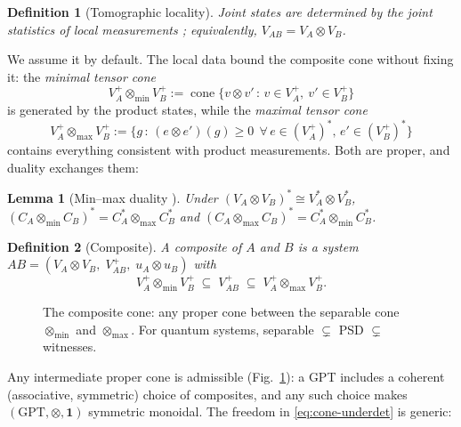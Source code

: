 \documentclass[prl,aps,10pt,superscriptaddress, floatfix]{revtex4-2}
\newtheorem{lemma}{Lemma}
\newtheorem*{defi}{Definition}
\begin{document}
\begin{defi}[Tomographic locality]
Joint states are determined by the joint statistics of local measurements \cite{Hardy2001,Barrett2007}; equivalently, $V_{AB}=V_A\otimes V_B$.
\end{defi}

We assume it by default. The local data bound the composite cone without fixing it: the \emph{minimal tensor cone}
\[
V_A^+\otimes_{\min}V_B^+:=\operatorname{cone}\{v\otimes v'\,:\,v\in V_A^+,\ v'\in V_B^+\}
\]
is generated by the product states, while the \emph{maximal tensor cone}
\[
V_A^+\otimes_{\max}V_B^+:=\{g\,:\,(e\otimes e')(g)\ge0\ \ \forall\,e\in(V_A^+)^*,\,e'\in(V_B^+)^*\}
\]
contains everything consistent with product measurements. Both are proper, and duality exchanges them:

\begin{lemma}[Min--max duality \cite{ALPP2021,Plavala2023}]\label{lem:minmax}
Under $(V_A\otimes V_B)^*\cong V_A^*\otimes V_B^*$,
$(C_A\otimes_{\min}C_B)^*=C_A^*\otimes_{\max}C_B^*$ and
$(C_A\otimes_{\max}C_B)^*=C_A^*\otimes_{\min}C_B^*$.
\end{lemma}

\begin{defi}[Composite]
A \emph{composite} of $A$ and $B$ is a system $AB=(V_A\otimes V_B,\;V_{AB}^+,\;u_A\otimes u_B)$ with
\begin{equation}\label{eq:cone-underdet}
V_A^+\otimes_{\min}V_B^+\;\subseteq\;V_{AB}^+\;\subseteq\;V_A^+\otimes_{\max}V_B^+ .
\end{equation}
\end{defi}

\begin{figure}[t]
\centering
{}
\caption{The composite cone: any proper cone between the separable cone $\otimes_{\min}$ and $\otimes_{\max}$. For quantum systems, separable $\subsetneq$ PSD $\subsetneq$ witnesses.}
\label{fig:composite}
\end{figure}

Any intermediate proper cone is admissible (Fig.~\ref{fig:composite}): a GPT includes a coherent (associative, symmetric) choice of composites, and any such choice makes $(\mathrm{GPT},\otimes,\mathbf 1)$ symmetric monoidal. The freedom in \eqref{eq:cone-underdet} is generic:
\end{document}
